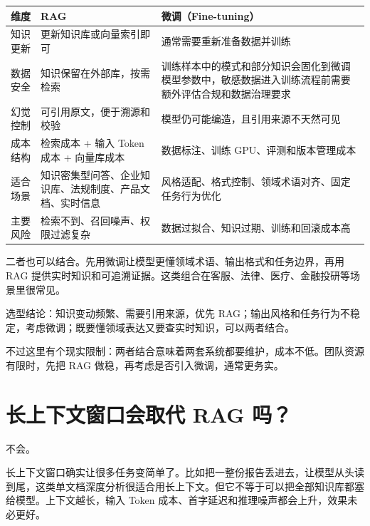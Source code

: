 \documentclass[9pt,a4paper,twocolumn]{ctexart}
\begin{document}
{\footnotesize
\begin{tabular}{|p{}|p{}|p{}|}
\hline
\textbf{维度} & \textbf{RAG} & \textbf{微调（Fine-tuning）} \\
\hline
知识更新 & 更新知识库或向量索引即可 & 通常需要重新准备数据并训练 \\
\hline
数据安全 & 知识保留在外部库，按需检索 & 训练样本中的模式和部分知识会固化到微调模型参数中，敏感数据进入训练流程前需要额外评估合规和数据治理要求 \\
\hline
幻觉控制 & 可引用原文，便于溯源和校验 & 模型仍可能编造，且引用来源不天然可见 \\
\hline
成本结构 & 检索成本 + 输入 Token 成本 + 向量库成本 & 数据标注、训练 GPU、评测和版本管理成本 \\
\hline
适合场景 & 知识密集型问答、企业知识库、法规制度、产品文档、实时信息 & 风格适配、格式控制、领域术语对齐、固定任务行为优化 \\
\hline
主要风险 & 检索不到、召回噪声、权限过滤复杂 & 数据过拟合、知识过期、训练和回滚成本高 \\
\hline
\end{tabular}
}



二者也可以结合。先用微调让模型更懂领域术语、输出格式和任务边界，再用 RAG 提供实时知识和可追溯证据。这类组合在客服、法律、医疗、金融投研等场景里很常见。



选型结论：知识变动频繁、需要引用来源，优先 RAG；输出风格和任务行为不稳定，考虑微调；既要懂领域表达又要查实时知识，可以两者结合。



不过这里有个现实限制：两者结合意味着两套系统都要维护，成本不低。团队资源有限时，先把 RAG 做稳，再考虑是否引入微调，通常更务实。



\section*{长上下文窗口会取代 RAG 吗？}


不会。



长上下文窗口确实让很多任务变简单了。比如把一整份报告丢进去，让模型从头读到尾，这类单文档深度分析很适合用长上下文。但它不等于可以把全部知识库都塞给模型。上下文越长，输入 Token 成本、首字延迟和推理噪声都会上升，效果未必更好。
\end{document}
